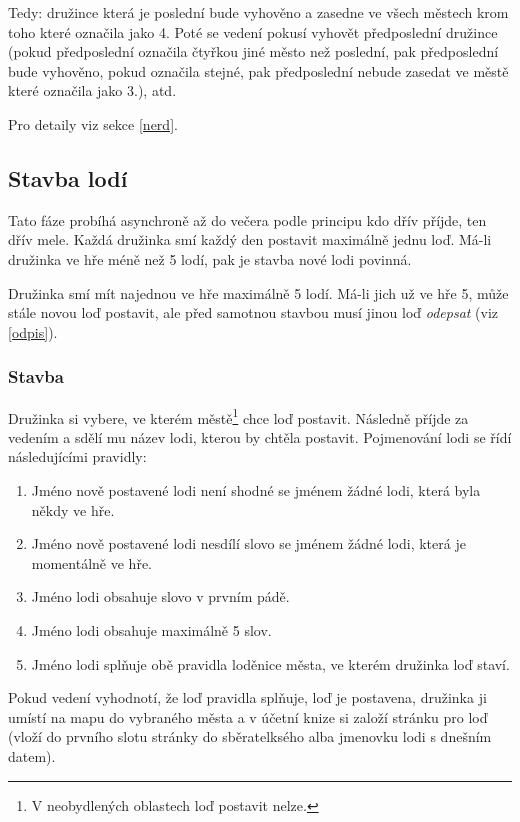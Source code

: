 \documentclass[a4paper, 12pt, twoside]{article}
\begin{document}
Tedy: družince která je poslední bude vyhověno a zasedne ve všech městech krom toho které označila jako 4.  Poté se vedení pokusí vyhovět předposlední družince
(pokud předposlední označila čtyřkou jiné město než poslední, pak předposlední bude vyhověno, pokud označila stejné, pak předposlední nebude zasedat ve městě
které označila jako 3.), atd.

Pro detaily viz sekce \ref{nerd}.

\subsection{Stavba lodí}
\label{stavba_lodi}

Tato fáze probíhá asynchroně až do večera podle principu kdo dřív příjde, ten dřív mele.  Každá družinka smí každý den postavit maximálně jednu loď.
Má-li družinka ve hře méně než 5 lodí, pak je stavba nové lodi povinná.

Družinka smí mít najednou ve hře maximálně 5 lodí.  Má-li jich už ve hře 5, může stále novou loď postavit, ale před samotnou stavbou musí jinou loď
\emph{odepsat} (viz \ref{odpis}).


\subsubsection{Stavba}

Družinka si vybere, ve kterém městě\footnote{V neobydlených oblastech loď postavit nelze.} chce loď postavit.  Následně příjde za vedením a sdělí mu název lodi, kterou by chtěla postavit.  Pojmenování lodi 
se řídí následujícími pravidly:

\begin{enumerate}
    \item Jméno nově postavené lodi není shodné se jménem žádné lodi, která byla někdy ve hře.
    \item Jméno nově postavené lodi nesdílí slovo se jménem žádné lodi, která je momentálně ve hře.
    \item Jméno lodi obsahuje slovo v prvním pádě.
    \item Jméno lodi obsahuje maximálně 5 slov.
    \item Jméno lodi splňuje obě pravidla loděnice města, ve kterém družinka loď staví.
\end{enumerate}

Pokud vedení vyhodnotí, že loď pravidla splňuje, loď je postavena, družinka ji umístí na mapu do vybraného města a v účetní knize si založí stránku pro 
loď (vloží do prvního slotu stránky do sběratelksého alba jmenovku lodi s dnešním datem).
\end{document}
